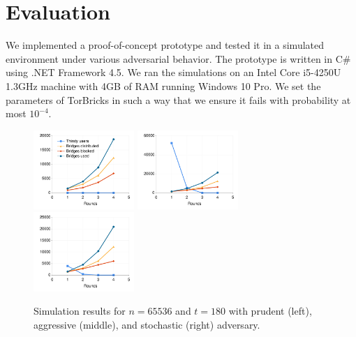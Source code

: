 \documentclass[USenglish,oneside,twocolumn]{article}
\newcommand{\bricks}{}
\def\bricks/{\textsf{\sfsize \mbox{TorBricks}}}
\newcommand{\sfsize}{\fontsize{0.68\baselineskip}{0.68\baselineskip}\selectfont}
\begin{document}
\section{Evaluation} \label{sec:simulations}
We implemented a proof-of-concept prototype and tested it in a simulated environment under various adversarial behavior. The prototype is written in C\# using .NET Framework 4.5. We ran the simulations on an Intel Core i5-4250U 1.3GHz machine with 4GB of RAM running Windows 10 Pro. We set the parameters of \bricks/ in such a way that we ensure it fails with probability at most $10^{-4}$. 

\begin{figure}
	\hspace{-0.8em}\includegraphics[width=0.34\textwidth]{images/plot-prudent-65536}
	\hspace{-0.5em}\includegraphics[width=0.34\textwidth]{images/plot-aggressive-65536}
	\hspace{-0.5em}\includegraphics[width=0.34\textwidth]{images/plot-stochastic-65536}
	\caption{Simulation results for ${n=65536}$ and ${t=180}$ with prudent (left), aggressive (middle), and stochastic (right) adversary.}
	\label{fig:plot1} 
\end{figure}
\end{document}

